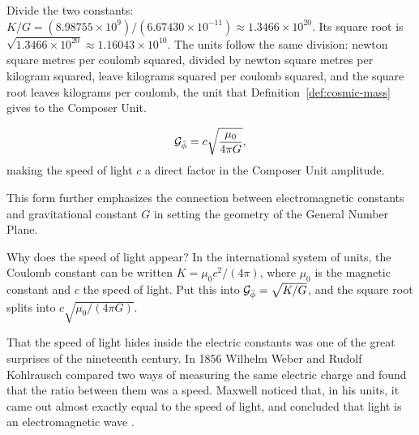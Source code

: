 \begin{workedexample}
Divide the two constants: $K/G = (8.98755 \times 10^{9}) / (6.67430 \times 10^{-11}) \approx 1.3466 \times 10^{20}$. Its square root is $\sqrt{1.3466 \times 10^{20}} \approx 1.16043 \times 10^{10}$. The units follow the same division: newton square metres per coulomb squared, divided by newton square metres per kilogram squared, leave kilograms squared per coulomb squared, and the square root leaves kilograms per coulomb, the unit that Definition~\ref{def:cosmic-mass} gives to the Composer Unit.
\end{workedexample}

\begin{remark}\label{rem:light}
\[
\mathcal{G}_{\bar{\phi}} = c\sqrt{\frac{\mu_0}{4\pi G}},
\]
making the speed of light $c$ a direct factor in the Composer Unit amplitude.

This form further emphasizes the connection between electromagnetic constants and gravitational constant $G$ in setting the geometry of the General Number Plane.
\end{remark}

\begin{plainwords}
Why does the speed of light appear? In the international system of units, the Coulomb constant can be written $K = \mu_0 c^2/(4\pi)$, where $\mu_0$ is the magnetic constant and $c$ the speed of light. Put this into $\mathcal{G}_{\bar{\phi}} = \sqrt{K/G}$, and the square root splits into $c\sqrt{\mu_0/(4\pi G)}$.

That the speed of light hides inside the electric constants was one of the great surprises of the nineteenth century. In 1856 Wilhelm Weber and Rudolf Kohlrausch compared two ways of measuring the same electric charge and found that the ratio between them was a speed. Maxwell noticed that, in his units, it came out almost exactly equal to the speed of light, and concluded that light is an electromagnetic wave \citep{Maxwell1865}.
\end{plainwords}

